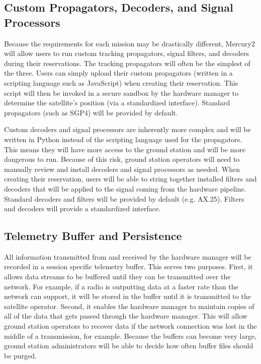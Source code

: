 \documentclass{mxl-design}
\begin{document}
\subsection{Custom Propagators, Decoders, and Signal Processors}
\label{sec:custom_scripts}
Because the requirements for each mission may be drastically different, Mercury2 will allow users to run custom tracking propagators, signal filters, and decoders during their reservations. The tracking propagators will often be the simplest of the three. Users can simply upload their custom propagators (written in a scripting language such as JavaScript) when creating their reservation. This script will then be invoked in a secure sandbox by the hardware manager to determine the satellite's position (via a standardized interface). Standard propagators (such as SGP4) will be provided by default.

Custom decoders and signal processors are inherently more complex and will be written in Python instead of the scripting language used for the propagators. This means they will have more access to the ground station and will be more dangerous to run. Because of this risk, ground station operators will need to manually review and install decoders and signal processors as needed. When creating their reservation, users will be able to string together installed filters and decoders that will be applied to the signal coming from the hardware pipeline. Standard decoders and filters will be provided by default (e.g. AX.25). Filters and decoders will provide a standardized interface.

\subsection{Telemetry Buffer and Persistence}
\label{sec:telemetry_buffer}
All information transmitted from and received by the hardware manager will be recorded in a session specific telemetry buffer. This serves two purposes. First, it allows data streams to be buffered until they can be transmitted over the network. For example, if a radio is outputting data at a faster rate than the network can support, it will be stored in the buffer until it is transmitted to the satellite operator. Second, it enables the hardware manager to maintain copies of all of the data that gets passed through the hardware manager. This will allow ground station operators to recover data if the network connection was lost in the middle of a transmission, for example. Because the buffers can become very large, ground station administrators will be able to decide how often buffer files should be purged.
\end{document}
